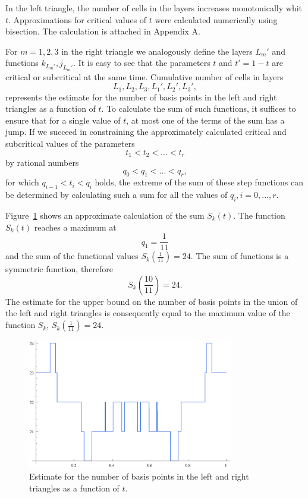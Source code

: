 In the left triangle, the number of cells in the layers increases monotonically whit $t$. Approximations for critical values of $t$ were calculated numerically using bisection. The calculation is attached in Appendix A.

For $m = 1,2,3$ in the right triangle we analogously define the layers $L_{m}'$ and functions $k_{L_{m}'}, j_{L_{m}'}$. It is easy to see that the parameters $t$ and $t' = 1 - t$ are critical or subcritical at the same time. Cumulative number of cells in layers
$$
L_{1}, L_{2}, L_{3},L_{1}', L_{2}', L_{3}',
$$
represents the estimate for the number of basis points in the left and right triangles as a function of $t$. To calculate the sum of such functions, it suffices to ensure that for a single value of $t$, at most one of the terms of the sum has a jump. If we succeed in constraining the approximately calculated critical and subcritical values of the parameters
$$
t_{1} < t_{2} < ... < t_{r}
$$
by rational numbers
$$
q_{0} < q_{1} < ... < q_{r},
$$
for which $q_{i-1} < t_{i} < q_{i}$ holds, the extreme of the sum of these step functions can be determined by calculating such a sum for all the values of $q_{i}, i = 0, ..., r$.

Figure~\ref{fig: left-and-right-layers-estimates} shows an approximate calculation of the sum $S_{k}(t)$. The function $S_{k}(t)$ reaches a maximum at
$$
q_{1} = \frac{1}{11}
$$
and the sum of the functional values $S_{k}(\frac{1}{11}) = 24$. The sum of functions is a symmetric function, therefore
$$
S_{k}(\frac{10}{11}) = 24.
$$
The estimate for the upper bound on the number of basis points in the union of the left and right triangles is consequently equal to the maximum value of the function $S_{k}$, $S_{k}(\frac{1}{11}) = 24$.

\begin{figure}
\centering
\includegraphics[width=0.8\textwidth]{./figures/left-and-right-layers-estimates-small.pdf}
\caption{Estimate for the number of basis points in the left and right triangles as a function of $t$.}
\label{fig: left-and-right-layers-estimates}
\end{figure}

